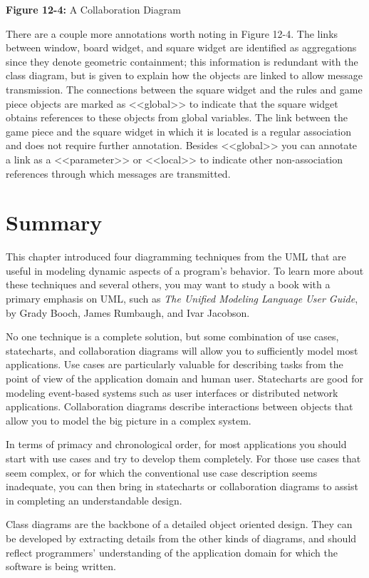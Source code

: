 {\sffamily\bfseries Figure 12-4:}
{\sffamily A Collaboration Diagram}

\bigskip

There are a couple more annotations worth noting in Figure 12-4. The links
between window, board widget, and square widget are identified as aggregations
since they denote geometric containment; this information is redundant with the
class diagram, but is given to explain how the objects are linked to allow
message transmission. The connections between the square widget and the rules
and game piece objects are marked as
{\textless}{\textless}global{\textgreater}{\textgreater} to indicate that the
square widget obtains references to these objects from global variables. The
link between the game piece and the square widget in which it is located is a
regular association and does not require further annotation. Besides
{\textless}{\textless}global{\textgreater}{\textgreater} you can annotate a
link as a {\textless}{\textless}parameter{\textgreater}{\textgreater} or
{\textless}{\textless}local{\textgreater}{\textgreater} to indicate other
non-association references through which messages are transmitted.

\section{Summary}

This chapter introduced four diagramming techniques from the UML that
are useful in modeling dynamic aspects of a program's behavior. To
learn more about these techniques and several others, you may want to
study a book with a primary emphasis on UML, such as
\textit{The Unified Modeling Language User Guide}, by
Grady Booch, James Rumbaugh, and Ivar Jacobson.

No one technique is a complete solution, but some combination of use
cases, statecharts, and collaboration diagrams will allow you to
sufficiently model most applications. Use cases are particularly
valuable for describing tasks from the point of view of the
application domain and human user. Statecharts are good for modeling
event-based systems such as user interfaces or distributed network
applications.  Collaboration diagrams describe interactions between
objects that allow you to model the big picture in a complex system.

In terms of primacy and chronological order, for most applications you should
start with use cases and try to develop them completely. For those use cases
that seem complex, or for which the conventional use case description seems
inadequate, you can then bring in statecharts or collaboration diagrams to
assist in completing an understandable design.

Class diagrams are the backbone of a detailed object oriented design.  They can
be developed by extracting details from the other kinds of diagrams, and should
reflect programmers' understanding of the application domain for which the
software is being written.
